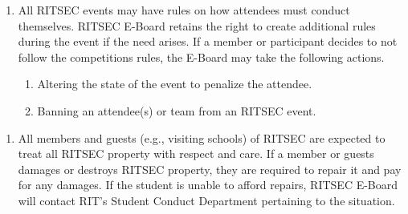 
\begin{enumerate}
      \item All RITSEC events may have rules on how attendees must conduct themselves.
            RITSEC E-Board retains the right to create additional rules during the event if
            the need arises. If a member or participant decides to not follow the
            competitions rules, the E-Board may take the following actions.
            \begin{enumerate}
                  \item Altering the state of the event to penalize the attendee.
                  \item Banning an attendee(s) or team from an RITSEC event.
            \end{enumerate}
\end{enumerate}


\begin{enumerate}
      \item All members and guests (e.g., visiting schools) of RITSEC are expected to treat
            all RITSEC property with respect and care. If a member or guests damages or
            destroys RITSEC property, they are required to repair it and pay for any
            damages. If the student is unable to afford repairs, RITSEC E-Board will
            contact RIT’s Student Conduct Department pertaining to the situation.
\end{enumerate}